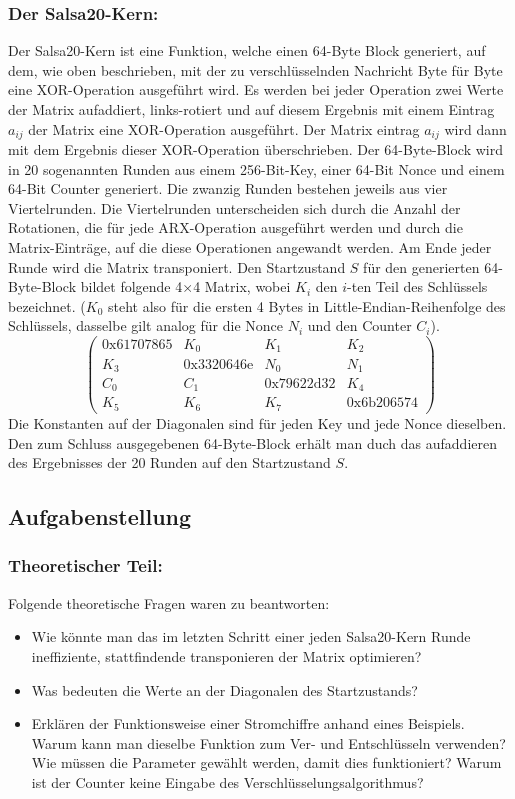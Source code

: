 \documentclass[course=erap]{aspdoc}
\begin{document}
\subsubsection{Der Salsa20-Kern:}
Der Salsa20-Kern ist eine Funktion, welche einen 64-Byte Block generiert, auf dem, wie oben beschrieben, mit 
der zu verschlüsselnden Nachricht Byte für Byte eine XOR-Operation ausgeführt wird. Es werden bei jeder Operation 
zwei Werte der Matrix aufaddiert, links-rotiert und auf diesem Ergebnis mit einem Eintrag $a_{ij}$ der Matrix eine XOR-Operation ausgeführt.
Der Matrix eintrag $a_{ij}$ wird dann mit dem Ergebnis dieser XOR-Operation überschrieben.
Der 64-Byte-Block wird in 20 sogenannten Runden aus einem 256-Bit-Key, einer 64-Bit Nonce und einem 64-Bit 
Counter generiert. Die zwanzig Runden bestehen jeweils aus vier Viertelrunden. Die Viertelrunden unterscheiden sich 
durch die Anzahl der Rotationen, die für jede ARX-Operation ausgeführt werden und durch die Matrix-Einträge, auf die 
diese Operationen angewandt werden. Am Ende jeder Runde wird die Matrix transponiert.
Den Startzustand $S$ für den generierten 64-Byte-Block bildet folgende 4$\times$4 Matrix, wobei $K_i$ den $i$-ten Teil
des Schlüssels bezeichnet. ($K_0$ steht also für die ersten 4 Bytes in Little-Endian-Reihenfolge des Schlüssels, dasselbe gilt analog für die
Nonce $N_i$ und den Counter $C_i$).
\[
    \begin{pmatrix}
    0\text{x}61707865 & K_0 & K_1 & K_2\\
    K_3 & 0\text{x}3320646\text{e} & N_0 & N_1\\
    C_0 & C_1 & 0\text{x}79622\text{d}32 & K_4\\
    K_5 & K_6 & K_7 & 0\text{x}6\text{b}206574
    \end{pmatrix}
\]
Die Konstanten auf der Diagonalen sind für jeden Key und jede Nonce dieselben.
Den zum Schluss ausgegebenen 64-Byte-Block erhält man duch das aufaddieren des 
Ergebnisses der 20 Runden auf den Startzustand $S$.

\subsection{Aufgabenstellung}

\subsubsection{Theoretischer Teil:}
Folgende theoretische Fragen waren zu beantworten:
\begin{itemize}
    \item Wie könnte man das im letzten Schritt einer jeden Salsa20-Kern Runde ineffiziente, stattfindende transponieren der Matrix optimieren?
    \item Was bedeuten die Werte an der Diagonalen des Startzustands?
    \item Erklären der Funktionsweise einer Stromchiffre anhand eines Beispiels. Warum kann man dieselbe Funktion zum Ver- und Entschlüsseln verwenden? Wie müssen die Parameter gewählt werden, damit dies funktioniert? Warum ist der Counter keine Eingabe des Verschlüsselungsalgorithmus?
\end{itemize}
\end{document}
